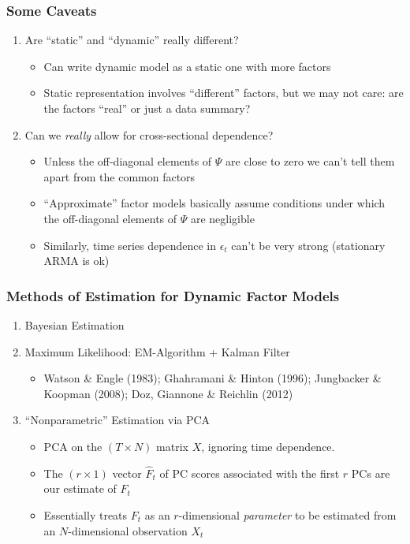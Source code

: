 \begin{frame}
	\frametitle{Some Caveats}

\begin{enumerate}
	\item Are ``static'' and ``dynamic'' really different?
    \begin{itemize}
		\item Can write dynamic model as a static one with more factors
		\item Static representation involves ``different'' factors, but we may not care: are the factors ``real'' or just a data summary?
	\end{itemize} 
\item Can we \emph{really} allow for cross-sectional dependence?
  \begin{itemize}
		\item Unless the off-diagonal elements of $\Psi$ are close to zero we can't tell them apart from the common factors
		\item ``Approximate'' factor models basically assume conditions under which the off-diagonal elements of $\Psi$ are negligible
		\item Similarly, time series dependence in $\epsilon_t$ can't be very strong (stationary ARMA is ok)
	\end{itemize}
\end{enumerate}

\end{frame}
\begin{frame}
	\frametitle{Methods of Estimation for Dynamic Factor Models}

	\begin{enumerate}
		\item Bayesian Estimation
		\item Maximum Likelihood: EM-Algorithm + Kalman Filter 
      \begin{itemize}
          \footnotesize
			\item Watson \& Engle (1983); Ghahramani \& Hinton (1996); Jungbacker \& Koopman (2008);  Doz, Giannone \& Reichlin (2012)
		\end{itemize}
		\item ``Nonparametric'' Estimation via PCA
			\begin{itemize}
        \item PCA on the $(T\times N)$ matrix $X$, ignoring time dependence.
				\item The $(r\times 1)$ vector $\widehat{F}_t$ of PC scores associated with the first $r$ PCs are our estimate of $F_t$ 
				\item Essentially treats $F_t$ as an $r$-dimensional \emph{parameter} to be estimated from an $N$-dimensional observation $X_t$
			\end{itemize}
	\end{enumerate}
\end{frame}

